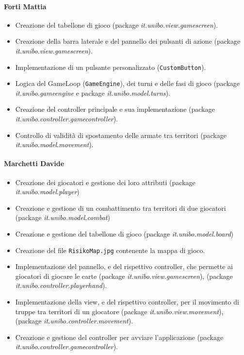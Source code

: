 \documentclass[a4paper,12pt]{report}
\begin{document}
\paragraph{Forti Mattia}
%
\begin{itemize}
    \item Creazione del tabellone di gioco (package \textit{it.unibo.view.gamescreen}).
    \item Creazione della barra laterale e del pannello dei pulsanti di azione (package \textit{it.unibo.view.gamescreen}).
    \item Implementazione di un pulsante personalizzato (\texttt{CustomButton}).
    \item Logica del GameLoop (\texttt{GameEngine}), dei turni e delle fasi di gioco (package \textit{it.unibo.gameengine} e package \textit{it.unibo.model.turns}).
    \item Creazione del controller principale e sua implementazione (package \textit{it.unibo.controller.gamecontroller}).
    \item Controllo di validit\`a di spostamento delle armate tra territori (package \textit{it.unibo.model.movement}).
\end{itemize}
%
\paragraph{Marchetti Davide}
%
\begin{itemize}
    \item Creazione dei giocatori e gestione dei loro attributi (package \textit{it.unibo.model.player})
    \item Creazione e gestione di un combattimento tra territori di due giocatori (package \textit{it.unibo.model.combat})
    \item Creazione e gestione del tabellone di gioco (package \textit{it.unibo.model.board})
    \item Creazione del file \texttt{RisikoMap.jpg} contenente la mappa di gioco.
    \item Implementazione del pannello, e del rispettivo controller, che permette ai giocatori di giocare le carte (package \textit{it.unibo.view.gamescreen}), (package \textit{it.unibo.controller.playerhand}).
    \item Implementazione della view, e del rispettivo controller, per il movimento di truppe tra territori di un giocatore (package \textit{it.unibo.view.movement}), (package \textit{it.unibo.controller.movement}).
    \item Creazione e gestione del controller per avviare l'applicazione (package \textit{it.unibo.controller.gamecontroller}).
\end{itemize}
%
\end{document}
